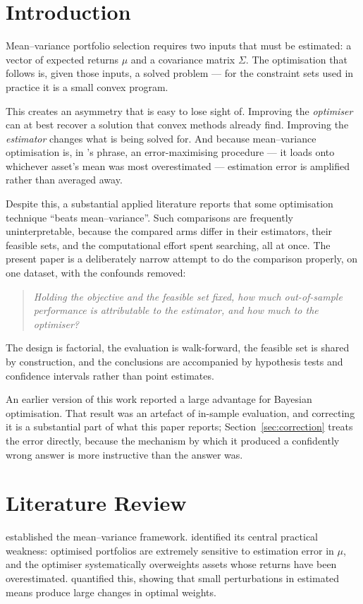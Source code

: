 \documentclass[a4paper,12pt]{article}
\begin{document}
\newpage
\tableofcontents
\newpage

\section{Introduction}
Mean--variance portfolio selection \citep{markowitz1952} requires two inputs that
must be estimated: a vector of expected returns $\mu$ and a covariance matrix
$\Sigma$. The optimisation that follows is, given those inputs, a solved problem
--- for the constraint sets used in practice it is a small convex program.

This creates an asymmetry that is easy to lose sight of. Improving the
\emph{optimiser} can at best recover a solution that convex methods already find.
Improving the \emph{estimator} changes what is being solved for. And because
mean--variance optimisation is, in \citeauthor{michaud1989}'s phrase, an
error-maximising procedure --- it loads onto whichever asset's mean was most
overestimated --- estimation error is amplified rather than averaged away.

Despite this, a substantial applied literature reports that some
optimisation technique ``beats mean--variance''. Such comparisons are frequently
uninterpretable, because the compared arms differ in their estimators, their
feasible sets, and the computational effort spent searching, all at once. The
present paper is a deliberately narrow attempt to do the comparison properly, on
one dataset, with the confounds removed:

\begin{quote}
\emph{Holding the objective and the feasible set fixed, how much out-of-sample
performance is attributable to the estimator, and how much to the optimiser?}
\end{quote}

The design is factorial, the evaluation is walk-forward, the feasible set is
shared by construction, and the conclusions are accompanied by hypothesis tests
and confidence intervals rather than point estimates.

An earlier version of this work reported a large advantage for Bayesian
optimisation. That result was an artefact of in-sample evaluation, and correcting
it is a substantial part of what this paper reports;
Section~\ref{sec:correction} treats the error directly, because the mechanism by
which it produced a confidently wrong answer is more instructive than the answer
was.

\section{Literature Review}
\citet{markowitz1952} established the mean--variance framework.
\citet{michaud1989} identified its central practical weakness: optimised
portfolios are extremely sensitive to estimation error in $\mu$, and the
optimiser systematically overweights assets whose returns have been
overestimated. \citet{best1991} quantified this, showing that small perturbations
in estimated means produce large changes in optimal weights.
\end{document}
